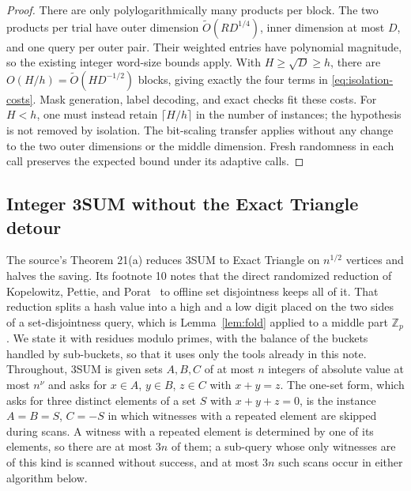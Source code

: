 \documentclass[11pt]{article}
\newcommand{\softO}{\widetilde O}
\begin{document}
\begin{proof}
There are only polylogarithmically many products per block. The two products
per trial have outer dimension $\softO(RD^{1/4})$, inner dimension at most
$D$, and one query per outer pair. Their weighted entries have polynomial
magnitude, so the existing integer word-size bounds apply. With
$H\ge\sqrt D\ge h$, there are $O(H/h)=\softO(HD^{-1/2})$ blocks, giving
exactly the four terms in \eqref{eq:isolation-costs}. Mask generation, label decoding, and exact
checks fit these costs. For $H<h$, one must instead retain
$\lceil H/h\rceil$ in the number of instances; the hypothesis is not
removed by isolation. The bit-scaling transfer applies without any change
to the two outer dimensions or the middle dimension. Fresh randomness in
each call preserves the expected bound under its adaptive calls.
\end{proof}


\subsection*{Integer 3SUM without the Exact Triangle detour}
The source's Theorem 21(a) reduces 3SUM to Exact Triangle on $n^{1/2}$
vertices and halves the saving. Its footnote 10 notes that the direct
randomized reduction of Kopelowitz, Pettie, and Porat~\cite{KPP16} to offline
set disjointness keeps all of it. That reduction splits a hash value into a
high and a low digit placed on the two sides of a set-disjointness query,
which is Lemma~\ref{lem:fold} applied to a middle part $\mathbb Z_p$. We
state it with residues modulo primes, with the balance of the buckets handled
by sub-buckets, so that it uses only the tools already in this note.
Throughout, 3SUM is given sets $A,B,C$ of at most $n$ integers of absolute
value at most $n^\nu$ and asks for $x\in A$, $y\in B$, $z\in C$ with $x+y=z$.
The one-set form, which asks for three distinct elements of a set $S$ with
$x+y+z=0$, is the instance $A=B=S$, $C=-S$ in which witnesses with a
repeated element are skipped during scans. A witness with a repeated
element is determined by one of its elements, so there are at most $3n$ of
them; a sub-query whose only witnesses are of this kind is scanned without
success, and at most $3n$ such scans occur in either algorithm below.
\end{document}
